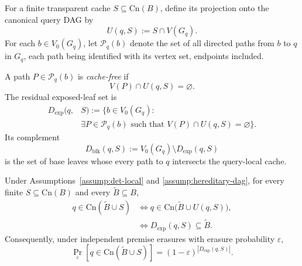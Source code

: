 \documentclass[10pt,a4paper]{amsart}
\newcommand{\Cn}{\text{Cn}}
\begin{document}
\begin{definition}
\label{def:query-local-residual}
For a finite transparent cache \(S\subseteq\Cn(B)\), define its projection onto
the canonical query DAG by
\begin{equation}
  U(q,S):=S\cap V(G_q).
\label{eq:query-local-projection}
\end{equation}
For each \(b\in V_0(G_q)\), let \(\mathcal P_q(b)\) denote the set of all
directed paths from \(b\) to \(q\) in \(G_q\), each path being identified
with its vertex set, endpoints included.

A path \(P\in\mathcal P_q(b)\) is \emph{cache-free} if
\[
  V(P)\cap U(q,S)=\varnothing.
\]
The residual exposed-leaf set is
\begin{equation}
  \begin{split}
    D_{\mathrm{exp}}(q,&S)
    := \bigl\{ b\in V_0(G_q) :  \\
    & \exists P\in\mathcal P_q(b) \text{ such that }
      V(P)\cap U(q,S)=\varnothing \bigr\}.
  \end{split}
\label{eq:def-exposed-leaves}
\end{equation}
Its complement
\begin{equation}
  D_{\mathrm{blk}}(q,S)
  :=
  V_0(G_q)\setminus D_{\mathrm{exp}}(q,S)
\label{eq:def-blocked-leaves}
\end{equation}
is the set of base leaves whose every path to \(q\) intersects the query-local
cache.
\end{definition}

\begin{theorem}
\label{thm:exact-residual-law}
Under Assumptions~\ref{assump:det-local} and
\ref{assump:hereditary-dag}, for every finite
\(S\subseteq\Cn(B)\) and every \(\widetilde B\subseteq B\),
\begin{align}
  q\in\Cn(\widetilde B\cup S)
  &\Longleftrightarrow
  q\in\Cn\bigl(\widetilde B\cup U(q,S)\bigr),
\label{eq:query-local-rigidity}\\
  &\Longleftrightarrow
  D_{\mathrm{exp}}(q,S)\subseteq\widetilde B.
\label{eq:exact-residual-event}
\end{align}
Consequently, under independent premise erasures with erasure probability
\(\varepsilon\),
\begin{equation}
  \Pr_{\varepsilon}
  \left[
    q\in\Cn(\widetilde B\cup S)
  \right]
  =
  (1-\varepsilon)^{|D_{\mathrm{exp}}(q,S)|}.
\label{eq:exact-residual-probability}
\end{equation}
\end{theorem}
\end{document}
